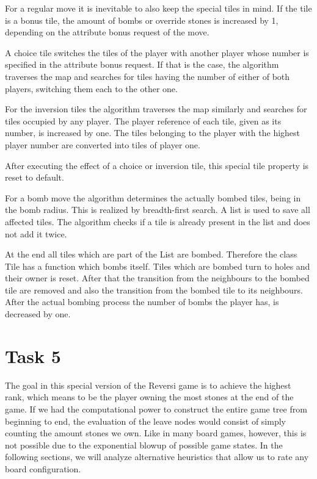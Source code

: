 \documentclass[a4paper,12pt]{article}
\begin{document}
For a regular move it is inevitable to also keep the special tiles in mind. If the tile is a bonus tile, the amount of bombs or override stones is increased by 1, depending on the attribute bonus request of the move.

A choice tile switches the tiles of the player with another player whose number is specified in the attribute bonus request. If that is the case, the algorithm traverses the map and searches for tiles having the number of either of both players, switching them each to the other one.

For the inversion tiles the algorithm traverses the map similarly and searches for tiles occupied by any player. The player reference of each tile, given as its number, is increased by one. The tiles belonging to the player with the highest player number are converted into tiles of player one.

After executing the effect of a choice or inversion tile, this special tile property is reset to default.

For a bomb move the algorithm determines the actually bombed tiles, being in the bomb radius. This is realized by breadth-first search. A list is used to save all affected tiles. The algorithm checks if a tile is already present in the list and does not add it twice.

At the end all tiles which are part of the List are bombed. Therefore the class Tile has a function which bombs itself. Tiles which are bombed turn to holes and their owner is reset. After that the transition from the neighbours to the bombed tile are removed and also the transition from the bombed tile to its neighbours. After the actual bombing process the number of bombs the player has, is decreased by one.

\section{Task 5}

The goal in this special version of the Reversi game is to achieve the highest rank, which means to be the player owning the most stones at the end of the game. If we had the computational power to construct the entire game tree from beginning to end, the evaluation of the leave nodes would consist of simply counting the amount stones we own. Like in many board games, however, this is not possible due to the exponential blowup of possible game states. In the following sections, we will analyze alternative heuristics that allow us to rate any board configuration.
\end{document}
